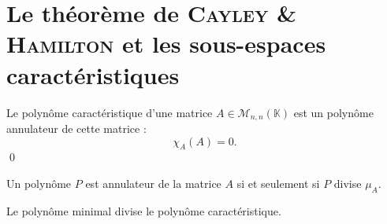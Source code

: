 \section{Le théorème de {\scshape Cayley} \& {\scshape Hamilton} et les sous-espaces caractéristiques}
\begin{thm}
	Le polynôme caractéristique d'une matrice $A \in \mathscr{M}_{n,n}(\mathds{K})$\/ est un polynôme annulateur de cette matrice : \[
		\chi_A(A) = 0
	.\] \qed
\end{thm}

\begin{rap}
	Un polynôme $P$\/ est annulateur de la matrice $A$\/ si et seulement si $P$\/ divise $\mu_A$.
\end{rap}

\begin{crlr}
	Le polynôme minimal divise le polynôme caractéristique.
\end{crlr}

